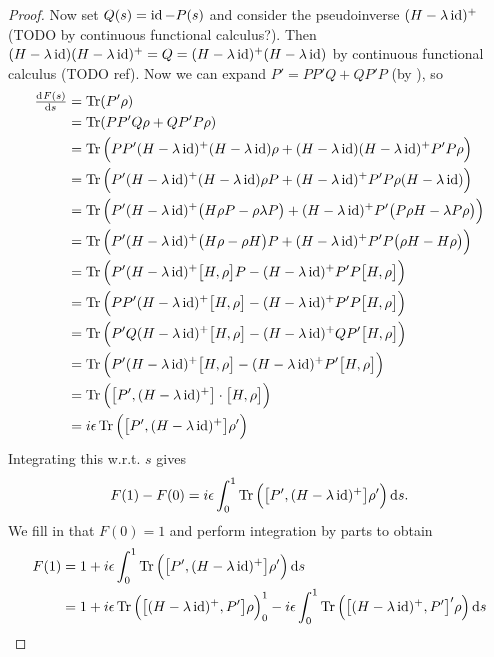 \begin{proof}
Now set $Q(s) = \operatorname{id} - P(s)$ and consider the pseudoinverse $(H-\lambda\operatorname{id})^+$ (TODO by continuous functional calculus?). Then $(H-\lambda\operatorname{id})(H-\lambda\operatorname{id})^+ = Q = (H-\lambda\operatorname{id})^+(H-\lambda\operatorname{id})$ by continuous functional calculus (TODO ref). Now we can expand $P' = PP'Q + QP'P$ (by ), so
\begin{align*}
\od{F(s)}{s} &= \Tr(P'\rho) \\
&= \Tr(PP'Q\rho + QP'P\rho) \\
&= \Tr\Big(PP'(H-\lambda\id)^+(H-\lambda\id)\rho + (H-\lambda\id)(H-\lambda\id)^+P'P\rho\Big) \\
&= \Tr\Big(P'(H-\lambda\id)^+(H-\lambda\id)\rho P + (H-\lambda\id)^+P'P\rho (H-\lambda\id)\Big) \\
&= \Tr\Big(P'(H-\lambda\id)^+\big(H\rho P - \rho \lambda P\big) + (H-\lambda\id)^+P' \big(P\rho H - \lambda P\rho \big)\Big) \\
&= \Tr\Big(P'(H-\lambda\id)^+\big(H\rho - \rho H\big)P + (H-\lambda\id)^+P'P\big(\rho H - H\rho \big)\Big) \\
&= \Tr\Big(P'(H-\lambda\id)^+\big[H,\rho\big]P - (H-\lambda\id)^+P'P\big[H, \rho\big]\Big) \\
&= \Tr\Big(PP'(H-\lambda\id)^+\big[H,\rho\big] - (H-\lambda\id)^+P'P\big[H, \rho\big]\Big) \\
&= \Tr\Big(P'Q(H-\lambda\id)^+\big[H,\rho\big] - (H-\lambda\id)^+QP'\big[H, \rho\big]\Big) \\
&= \Tr\Big(P'(H-\lambda\id)^+\big[H,\rho\big] - (H-\lambda\id)^+P'\big[H, \rho\big]\Big) \\
&= \Tr\Big(\big[P', (H-\lambda\id)^+\big]\cdot\big[H,\rho\big]\Big) \\
&= i\epsilon\Tr\Big(\big[P', (H-\lambda\id)^+\big]\rho'\Big) 
\end{align*}
Integrating this w.r.t. $s$ gives
\[ F(1) - F(0) = i\epsilon\int_0^1 \operatorname{Tr}\Big(\big[P', (H-\lambda\operatorname{id})^+\big]\rho'\Big)  \operatorname{d \!}{s}. \]
We fill in that $F(0) = 1$ and perform integration by parts to obtain
\begin{align*}
F(1) &= 1 + i\epsilon\int_0^1 \operatorname{Tr}\Big(\big[P', (H-\lambda\operatorname{id})^+\big]\rho'\Big)  \operatorname{d \!}{s} \\
&= 1 + i\epsilon\operatorname{Tr}\Big(\big[(H-\lambda\operatorname{id})^+, P'\big]\rho\Big)_0^1 - i\epsilon\int_0^1 \operatorname{Tr}\Big(\big[(H-\lambda\operatorname{id})^+, P'\big]'\rho\Big)  \operatorname{d \!}{s}
\end{align*}
\end{proof}


